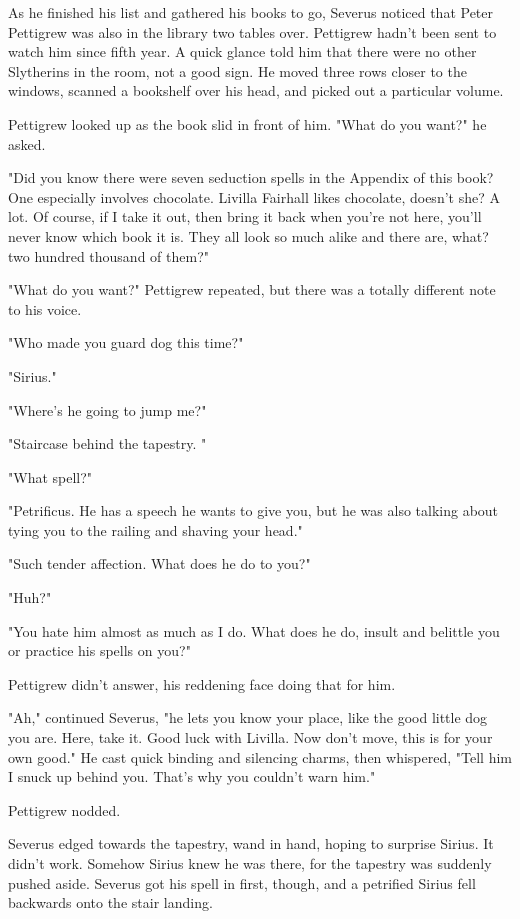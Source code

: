 \documentclass[a4paper,11pt]{article}
\begin{document}
As he finished his list and gathered his books to go, Severus noticed that Peter Pettigrew was also in the library two tables over. Pettigrew hadn't been sent to watch him since fifth year. A quick glance told him that there were no other Slytherins in the room, not a good sign. He moved three rows closer to the windows, scanned a bookshelf over his head, and picked out a particular volume.

Pettigrew looked up as the book slid in front of him. "What do you want?" he asked.

"Did you know there were seven seduction spells in the Appendix of this book? One especially involves chocolate. Livilla Fairhall likes chocolate, doesn't she? A lot. Of course, if I take it out, then bring it back when you're not here, you'll never know which book it is. They all look so much alike and there are, what? two hundred thousand of them?"

"What do you want?" Pettigrew repeated, but there was a totally different note to his voice.

"Who made you guard dog this time?"

"Sirius."

"Where's he going to jump me?"

"Staircase behind the tapestry. "

"What spell?"

"Petrificus. He has a speech he wants to give you, but he was also talking about tying you to the railing and shaving your head."

"Such tender affection. What does he do to you?"

"Huh?"

"You hate him almost as much as I do. What does he do, insult and belittle you or practice his spells on you?"

Pettigrew didn't answer, his reddening face doing that for him.

"Ah," continued Severus, "he lets you know your place, like the good little dog you are. Here, take it. Good luck with Livilla. Now don't move, this is for your own good." He cast quick binding and silencing charms, then whispered, "Tell him I snuck up behind you. That's why you couldn't warn him."

Pettigrew nodded.

Severus edged towards the tapestry, wand in hand, hoping to surprise Sirius. It didn't work. Somehow Sirius knew he was there, for the tapestry was suddenly pushed aside. Severus got his spell in first, though, and a petrified Sirius fell backwards onto the stair landing.
\end{document}
